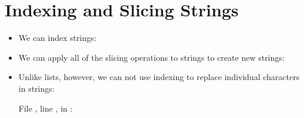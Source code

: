 \documentclass[letterpaper,10pt,english]{sphinxmanual}
\begin{document}
\section{Indexing and Slicing Strings}
\label{\detokenize{lecture_notes/lec10_lists2:indexing-and-slicing-strings}}\begin{itemize}
\item {} 
We can index strings:

%
\begin{sphinxVerbatim}[commandchars=\\\{\}]
  
\PYG{p}{[}\PYG{p}{]}
\PYG{p}{[}\PYG{p}{]}
\end{sphinxVerbatim}

\item {} 
We can apply all of the slicing operations to strings to create new
strings:

%
\begin{sphinxVerbatim}[commandchars=\\\{\}]
  
\PYG{p}{[}\PYG{p}{]}
\end{sphinxVerbatim}

\item {} 
Unlike lists, however, we can not use indexing to replace individual
characters in strings:

%
\begin{sphinxVerbatim}[commandchars=\\\{\}]
\PYG{p}{[}\PYG{p}{]}  
  File , line , in 
: 
\end{sphinxVerbatim}

\end{itemize}
\end{document}
